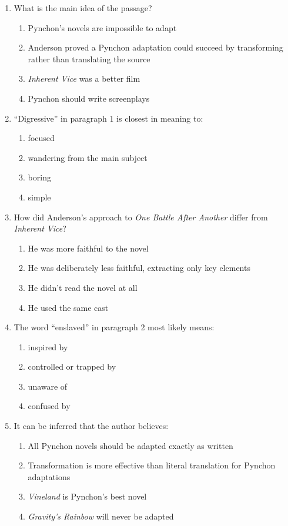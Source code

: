 \documentclass[10pt,a4paper]{article}
\begin{document}
\begin{enumerate}[label=\textbf{\arabic*.}]

\item What is the main idea of the passage?
\begin{enumerate}[label=(\Alph*)]
\item Pynchon's novels are impossible to adapt
\item Anderson proved a Pynchon adaptation could succeed by
transforming rather than translating the source
\item \emph{Inherent Vice} was a better film
\item Pynchon should write screenplays
\end{enumerate}

\item ``Digressive'' in paragraph 1 is closest in meaning to:
\begin{enumerate}[label=(\Alph*)]
\item focused \item wandering from the main subject
\item boring \item simple
\end{enumerate}

\item How did Anderson's approach to \emph{One Battle After Another}
differ from \emph{Inherent Vice}?
\begin{enumerate}[label=(\Alph*)]
\item He was more faithful to the novel
\item He was deliberately less faithful, extracting only key elements
\item He didn't read the novel at all
\item He used the same cast
\end{enumerate}

\item The word ``enslaved'' in paragraph 2 most likely means:
\begin{enumerate}[label=(\Alph*)]
\item inspired by \item controlled or trapped by
\item unaware of \item confused by
\end{enumerate}

\item It can be inferred that the author believes:
\begin{enumerate}[label=(\Alph*)]
\item All Pynchon novels should be adapted exactly as written
\item Transformation is more effective than literal translation for
Pynchon adaptations
\item \emph{Vineland} is Pynchon's best novel
\item \emph{Gravity's Rainbow} will never be adapted
\end{enumerate}


\end{enumerate}
\end{document}
